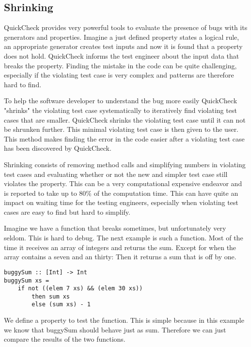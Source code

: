 \documentclass[a4paper, 12pt]{article} %
\begin{document}
\subsection{Shrinking}

QuickCheck provides very powerful tools to evaluate the presence of bugs with its generators and properties. Imagine a just defined property states a logical rule, an appropriate generator creates test inputs and now it is found that a property does not hold. QuickCheck informs the test engineer about the input data that breaks the property. Finding the mistake in the code can be quite challenging, especially if the violating test case is very complex and patterns are therefore hard to find. 

To help the software developer to understand the bug more easily QuickCheck "shrinks" the violating test case systematically to iteratively find violating test cases that are smaller. QuickCheck shrinks the violating test case until it can not be shrunken further. This minimal violating test case is then given to the user. This method makes finding the error in the code easier after a violating test case has been discovered by QuickCheck. \cite{Claessen2009}

Shrinking consists of removing method calls and simplifying numbers in violating test cases and evaluating whether or not the new and simpler test case still violates the property. This can be a very computational expensive endeavor and is reported to take up to 80\% of the computation time. This can have quite an impact on waiting time for the testing engineers, especially when violating test cases are easy to find but hard to simplify. \cite{Hughes:2016}

Imagine we have a function that breaks sometimes, but unfortunately very seldom. This is hard to debug. The next example is such a function. Most of the time it receives an array of integers and returns the sum. Except for when the array contains a seven and an thirty: Then it returns a sum that is off by one.

\begin{verbatim}
buggySum :: [Int] -> Int
buggySum xs = 
    if not ((elem 7 xs) && (elem 30 xs))
        then sum xs
        else (sum xs) - 1
\end{verbatim}

We define a property to test the function. This is simple because in this example we know that buggySum should behave just as sum. Therefore we can just compare the results of the two functions.
\end{document}
